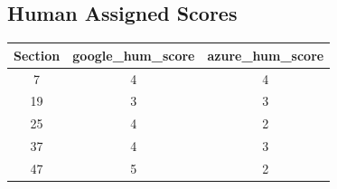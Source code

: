 \subsection*{Human Assigned Scores}

\begin{table}[h]
    \setlength\extrarowheight{5pt}
    \centering
    \begin{tabular}{|c|c|c|}
        \hline
        \textbf{Section} & \textbf{google\_hum\_score} & \textbf{azure\_hum\_score} \\
        \hline
        7 & 4 & 4 \\
        \hline
        19 & 3 & 3 \\
        \hline
        25 & 4 & 2 \\
        \hline
        37 & 4 & 3 \\
        \hline
        47 & 5 & 2 \\
        \hline
    \end{tabular}
\end{table}

\clearpage
\appendix